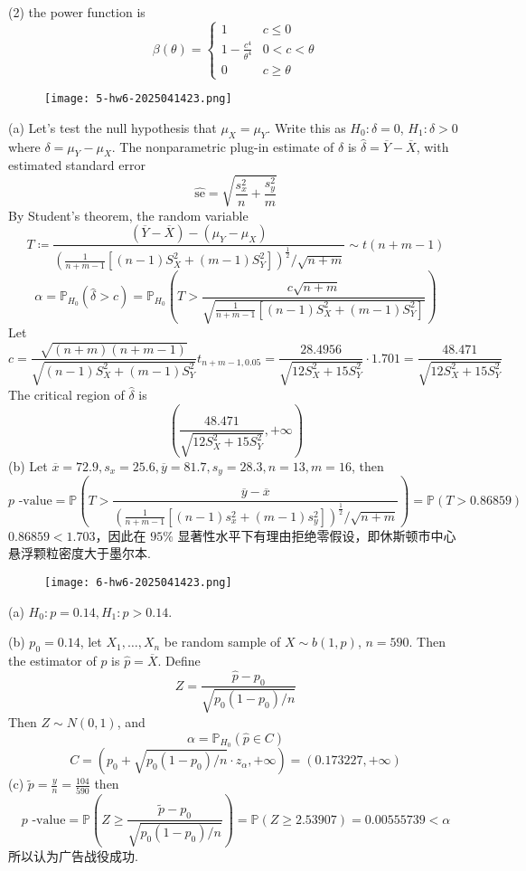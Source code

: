 (2) the power function is
\[
\beta(\theta)=\begin{cases}
1 & c\leq 0 \\
1-\frac{c^{4}}{\theta^{4}} & 0<c<\theta \\
0 & c\geq \theta
\end{cases}
\]
\begin{exercise}
\begin{figure}[H]
\centering
\texttt{[image: 5-hw6-2025041423.png]}
\label{}
\end{figure}
\end{exercise}
(a) Let's test the null hypothesis that $\mu_{X}=\mu_{Y}$. Write this as $H_0:\delta=0$, $H_1:\delta>0$ where $\delta=\mu_{Y}-\mu_{X}$. The nonparametric plug-in estimate of $\delta$ is  $\widehat{\delta}=\overline{Y}-\overline{X}$, with estimated standard error
\[
\widehat{\text{se}}=\sqrt{ \frac{s_x^2}{n}+\frac{s_{y}^2}{m} }
\]
By Student's theorem, the random variable
\[
T\coloneqq \frac{(\overline{Y}-\overline{X})-(\mu_{Y}-\mu_{X})}{\left( \frac{1}{n+m-1}\left[ (n-1)S_{X}^2+(m-1)S_{Y}^2 \right] \right)^{\frac{1}{2}}/\sqrt{ n+m }}\sim t(n+m-1)
\]
\[
\alpha=\mathbb{P}_{H_0}(\widehat{\delta}>c)=\mathbb{P}_{H_0}\left( T>\frac{c\sqrt{ n+m }}{\sqrt{ \frac{1}{n+m-1}[(n-1)S_{X}^2+(m-1)S_{Y}^2] }} \right)
\]
Let
\[
c=\frac{\sqrt{ (n+m)(n+m-1) }}{\sqrt{ (n-1)S_{X}^2+(m-1)S_{Y}^2 }}t_{n+m-1,0.05}=\frac{28.4956}{\sqrt{ 12S_{X}^2+15S_{Y}^2 }}\cdot1.701=\frac{48.471}{\sqrt{ 12S_{X}^2+15S_{Y}^2 }}
\]
The critical region of $\widehat{\delta}$ is
\[
(\frac{48.471}{\sqrt{ 12S_{X}^2+15S_{Y}^2 }},+\infty)
\]
(b) Let $\overline{x}=72.9,s_{x}=25.6,\overline{y}=81.7,s_{y}=28.3,n=13,m=16$, then
\[
p\text{ -value}=\mathbb{P}\left( T>\frac{\overline{y}-\overline{x}}{\left( \frac{1}{n+m-1}[(n-1)s_{x}^2+(m-1)s_{y}^2] \right)^{\frac{1}{2}}/\sqrt{ n+m }} \right)=\mathbb{P}(T>0.86859)
\]
$0.86859<1.703$，因此在 $95\%$ 显著性水平下有理由拒绝零假设，即休斯顿市中心悬浮颗粒密度大于墨尔本.

\begin{exercise}
\begin{figure}[H]
\centering
\texttt{[image: 6-hw6-2025041423.png]}
\label{}
\end{figure}
\end{exercise}
(a) $H_0:p=0.14,H_1:p>0.14$.

(b) $p_0=0.14$, let $X_1,\dots,X_n$ be random sample of $X\sim b(1,p)$, $n=590$. Then the estimator of $p$ is $\widehat{p}=\overline{X}$. Define
\[
Z=\frac{\widehat{p}-p_0}{\sqrt{ p_0(1-p_0)/n }}
\]
Then $Z\sim N(0,1)$, and
\[
\alpha=\mathbb{P}_{H_0}(\widehat{p}\in C)
\]
\[
C=(p_0+\sqrt{ p_0(1-p_0)/n }\cdot z_{\alpha},+\infty)=(0.173227,+\infty )
\]
(c) $\widetilde{p}=\frac{y}{n}=\frac{104}{590}$ then
\[
p\text{ -value}=\mathbb{P}\left( Z\geq \frac{\widetilde{p}-p_0}{\sqrt{ p_0(1-p_0)/n }} \right)=\mathbb{P}(Z\geq 2.53907)=0.00555739<\alpha
\]
所以认为广告战役成功.

